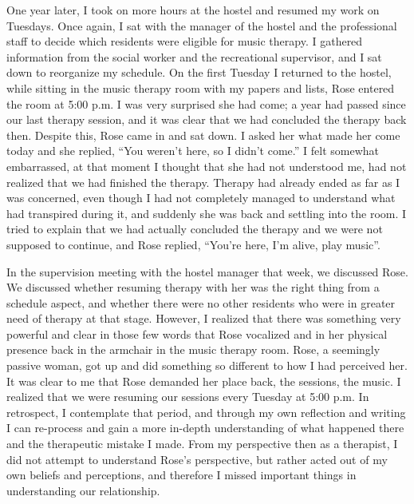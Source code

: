 \documentclass[authordate, empirical, issue]{jote-new-article}
\begin{document}
One year later, I took on more hours at the hostel and resumed my work on Tuesdays. Once again, I sat with the manager of the hostel and the professional staff to decide which residents were eligible for music therapy. I gathered information from the social worker and the recreational supervisor, and I sat down to reorganize my schedule. On the first Tuesday I returned to the hostel, while sitting in the music therapy room with my papers and lists, Rose entered the room at 5:00 p.m. I was very surprised she had come; a year had passed since our last therapy session, and it was clear that we had concluded the therapy back then. Despite this, Rose came in and sat down. I asked her what made her come today and she replied, “You weren't here, so I didn't come.” I felt somewhat embarrassed, at that moment I thought that she had not understood me, had not realized that we had finished the therapy. Therapy had already ended as far as I was concerned, even though I had not completely managed to understand what had transpired during it, and suddenly she was back and settling into the room. I tried to explain that we had actually concluded the therapy and we were not supposed to continue, and Rose replied, “You're here, I'm alive, play music”.



In the supervision meeting with the hostel manager that week, we discussed Rose. We discussed whether resuming therapy with her was the right thing from a schedule aspect, and whether there were no other residents who were in greater need of therapy at that stage. However, I realized that there was something very powerful and clear in those few words that Rose vocalized and in her physical presence back in the armchair in the music therapy room. Rose, a seemingly passive woman, got up and did something so different to how I had perceived her. It was clear to me that Rose demanded her place back, the sessions, the music. I realized that we were resuming our sessions every Tuesday at 5:00 p.m. In retrospect, I contemplate that period, and through my own reflection and writing I can re-process and gain a more in-depth understanding of what happened there and the therapeutic mistake I made. From my perspective then as a therapist, I did not attempt to understand Rose's perspective, but rather acted out of my own beliefs and perceptions, and therefore I missed important things in understanding our relationship.
\end{document}
